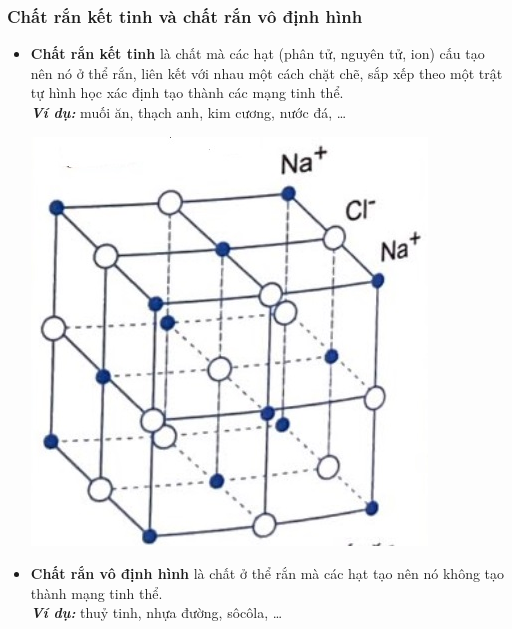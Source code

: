 \subsubsection{Chất rắn kết tinh và chất rắn vô định hình}
\begin{itemize}
	\item \textbf{Chất rắn kết tinh} là chất mà các hạt (phân tử, nguyên tử, ion) cấu tạo nên nó ở thể rắn, liên kết với nhau một cách chặt chẽ, sắp xếp theo một trật tự hình học xác định tạo thành các mạng tinh thể.\\
	\textit{\textbf{Ví dụ:}} muối ăn, thạch anh, kim cương, nước đá, \dots
	\begin{center}
		\includegraphics[width=0.2\linewidth]{figs/VN12-Y24-PH-SYL-001-3}
	\end{center}
	\item \textbf{Chất rắn vô định hình} là chất ở thể rắn mà các hạt tạo nên nó không tạo thành mạng tinh thể.\\
	\textbf{\textit{Ví dụ:}} thuỷ tinh, nhựa đường, sôcôla, \dots
\end{itemize}

